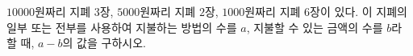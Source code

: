 $10000$원짜리 지폐 $3$장, $5000$원짜리 지폐 $2$장, $1000$원짜리 지폐 $6$장이 있다. 이 지폐의 일부 또는 전부를 사용하여 지불하는 방법의 수를 $a$, 지불할 수 있는 금액의 수를 $b$라 할 때, $a-b$의 값을 구하시오. 
